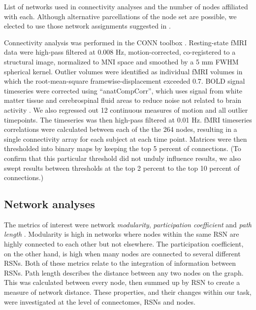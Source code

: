 \begin{table}[t]
	\renewcommand{\tabcolsep}{0.09cm}
	\centering
	
	\caption[List of networks.]{List of networks used in connectivity analyses and the number of nodes affiliated with each. Although alternative parcellations of the node set are possible, we elected to use those network assignments suggested in \citep{Power2013}.}
	\label{table:ch2-power-nodes}
\end{table}

Connectivity analysis was performed in the CONN toolbox \citep{WhitfieldGabrieli2012}. Resting-state fMRI data were high-pass filtered at 0.008 Hz, motion-corrected, co-registered to a structural image, normalized to MNI space and smoothed by a 5 mm FWHM spherical kernel. Outlier volumes were identified as individual fMRI volumes in which the root-mean-square framewise-displacement exceeded 0.7. BOLD signal timeseries were corrected using ``anatCompCorr'', which uses signal from white matter tissue and cerebrospinal fluid areas to reduce noise not related to brain activity \citep{Chai2012}. We also regressed out 12 continuous measures of motion and all outlier timepoints. The timeseries was then high-pass filtered at 0.01 Hz. fMRI timeseries correlations were calculated between each of the the 264 nodes, resulting in a single connectivity array for each subject at each time point. Matrices were then thresholded into binary maps by keeping the top 5 percent of connections. (To confirm that this particular threshold did not unduly influence results, we also swept results between thresholds at the top 2 percent to the top 10 percent of connections.)

\subsection{Network analyses}

The metrics of interest were network \textit{modularity}, \textit{participation coefficient} and \textit{path length} \citep{Rubinov2010}. Modularity is high in networks where nodes within the same RSN are highly connected to each other but not elsewhere. The participation coefficient, on the other hand, is high when many nodes are connected to several different RSNs. Both of these metrics relate to the integration of information between RSNs. Path length describes the distance between any two nodes on the graph. This was calculated between every node, then summed up by RSN to create a measure of network distance. These properties, and their changes within our task, were investigated at the level of connectomes, RSNs and nodes. 

